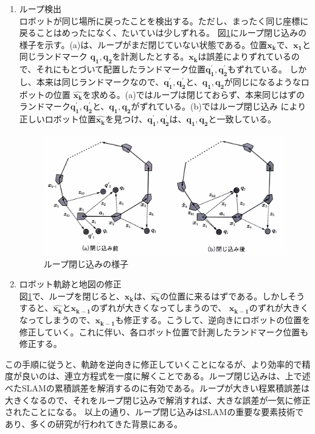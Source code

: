 \begin{enumerate}
  \item ループ検出\\
  ロボットが同じ場所に戻ったことを検出する。ただし、まったく同じ座標に戻ることはめったになく、たいていは少しずれる。
  図\ref{slam:loop_detect}にループ閉じ込みの様子を示す。(a)は、ループがまだ閉じていない状態である。位置$\bm{x_k}$で、$\bm{x_1}$と同じランドマーク
  $\bm{q_1},\bm{q_2}$を計測したとする。$\bm{x_k}$は誤差によりずれているので、それにもとづいて配置したランドマーク位置$\bm{q_1^{\prime}},\bm{q_2^{\prime}}$もずれている。
  しかし、本来は同じランドマークなので、$\bm{q_1^{\prime}},\bm{q_2^{\prime}}$と、$\bm{q_1},\bm{q_2}$が同じになるようなロボットの位置
  $\hat{\bm{x_k}}$を求める。(a)ではループは閉じておらず、本来同じはずのランドマーク$\bm{q_1^{\prime}},\bm{q_2^{\prime}}$と、$\bm{q_1},\bm{q_2}$がずれている。(b)ではループ閉じ込み
  により正しいロボット位置$\hat{\bm{x_k}}$を見つけ、$\bm{q_1^{\prime}},\bm{q_2^{\prime}}$は、$\bm{q_1},\bm{q_2}$と一致している。
  
  \begin{figure}[h]
    \begin{center}
    \includegraphics[width=.8\linewidth]{img/slam_10.pdf}
    \caption{ループ閉じ込みの様子\cite{slam:nyumon}}
    \label{slam:loop_detect}
    \end{center}
  \end{figure}
  \item ロボット軌跡と地図の修正\\
  図\ref{slam:loop_detect}で、ループを閉じると、$\bm{x_k}$は、$\hat{\bm{x_k}}$の位置に来るはずである。しかしそうすると、$\hat{\bm{x_k}}$と$\bm{x_{k-1}}$のずれが大きくなってしまうので、
  $\bm{x_{k-1}}$のずれが大きくなってしまうので、$\bm{x_{k-1}}$も修正する。こうして、逆向きにロボットの位置を修正していく。これに伴い、各ロボット位置で計測したランドマーク位置も修正する。
\end{enumerate}

この手順に従うと、軌跡を逆向きに修正していくことになるが、より効率的で精度が良いのは、連立方程式を一度に解くことである。ループ閉じ込みは、上で述べたSLAMの累積誤差を解消するのに有効である。ループが大きい程累積誤差は大きくなるので、それをループ閉じ込みで解消すれば、大きな誤差が一気に修正されたことになる。
以上の通り、ループ閉じ込みはSLAMの重要な要素技術であり、多くの研究が行われてきた背景にある。

